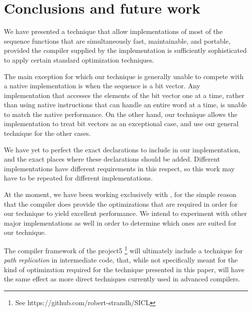 \section{Conclusions and future work}

We have presented a technique that allow implementations of most of
the \commonlisp{} sequence functions that are simultaneously fast,
maintainable, and portable, provided the compiler supplied by the
implementation is sufficiently sophisticated to apply certain standard
optimization techniques.

The main exception for which our technique is generally unable to
compete with a native implementation is when the sequence is a bit
vector.  Any implementation that accesses the elements of the bit
vector one at a time, rather than using native instructions that can
handle an entire word at a time, is unable to match the native
performance.  On the other hand, our technique allows the
\commonlisp{} implementation to treat bit vectors as an exceptional
case, and use our general technique for the other cases.

We have yet to perfect the exact declarations to include in our
implementation, and the exact places where these declarations should
be added.  Different \commonlisp{} implementations have different
requirements in this respect, so this work may have to be repeated for
different implementations.

At the moment, we have been working exclusively with \sbcl{}, for the
simple reason that the \sbcl{} compiler does provide the optimizations
that are required in order for our technique to yield excellent
performance.  We intend to experiment with other major implementations
as well in order to determine which ones are suited for our
technique.

The \cleavir{} compiler framework of the \sicl{} project5
\footnote{See https://github.com/robert-strandh/SICL} will ultimately
include a technique for \emph{path replication} in intermediate code,
that, while not specifically meant for the kind of optimization
required for the technique presented in this paper, will have the same
effect as more direct techniques currently used in advanced
compilers.
